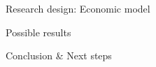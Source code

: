 \documentclass[notes,11pt, aspectratio=169]{beamer}
\begin{document}
\begin{frame}{Research design: Economic model}
	
\end{frame}

\begin{frame}{Possible results}
	
\end{frame}

\begin{frame}{Conclusion \& Next steps}
	
\end{frame}
\end{document}
